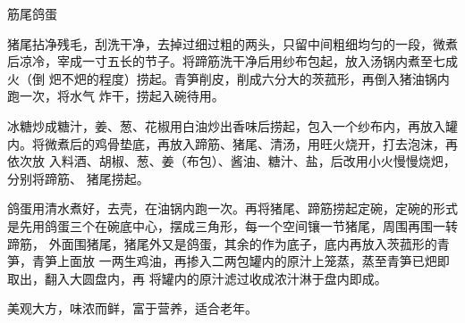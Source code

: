 \begin{recipe}[筋鞭鸽蛋]{筋尾鸽蛋}

\ingredients


\preparation

\step 猪尾拈净残毛，刮洗干净，去掉过细过粗的两头，只留中间粗细均匀的一段，微煮
后凉冷，宰成一寸五长的节子。将蹄筋洗干净后用纱布包起，放入汤锅内煮至七成火（倒
𤆵不𤆵的程度）捞起。青笋削皮，削成六分大的茨菰形，再倒入猪油锅内跑一次，将水气
炸干，捞起入碗待用。

\step 冰糖炒成糖汁，姜、葱、花椒用白油炒出香味后捞起，包入一个纱布内，再放入罐
内。将微煮后的鸡骨垫底，再放入蹄筋、猪尾、清汤，用旺火烧开，打去泡沫，再依次放
入料酒、胡椒、葱、姜（布包）、酱油、糖汁、盐，后改用小火慢慢烧𤆵，分别将蹄筋、
猪尾捞起。

\step 鸽蛋用清水煮好，去壳，在油锅内跑一次。再将猪尾、蹄筋捞起定碗，定碗的形式
是先用鸽蛋三个在碗底中心，摆成三角形，每一个空间镶一节猪尾，周围再围一转蹄筋，
外面围猪尾，猪尾外又是鸽蛋，其余的作为底子，底内再放入茨菰形的青笋，青笋上面放
一两生鸡油，再掺入二两包罐内的原汁上笼蒸，蒸至青笋已𤆵即取出，翻入大圆盘内，再
将罐内的原汁滤过收成浓汁淋于盘内即成。

\features

美观大方，味浓而鲜，富于营养，适合老年。

\end{recipe}

